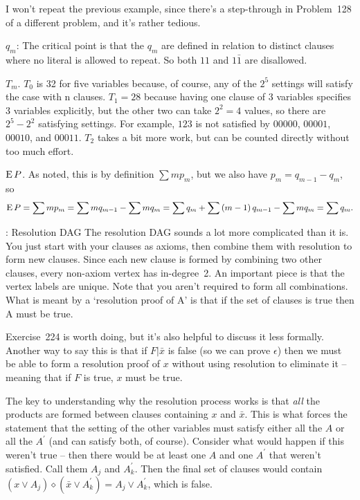 I won't repeat the previous example, since there's a step-through in 
Problem~128 of a different problem, and it's rather tedious.


 $q_m$: The critical point is that the $q_m$ are defined
in relation to distinct clauses where no literal is allowed to repeat.  So
both $11$ and $1 \bar 1$ are disallowed.

 $T_m$.  $T_0$ is 32 for five variables because, of course,
any of the $2^5$ settings will satisfy the case with n clauses.  $T_1 = 28$
because having one clause of 3 variables specifies 3 variables explicitly,
but the other two can take $2^2 = 4$ values, so there are $2^5 - 2^2$
satisfying settings.  For example, $123$ is not satisfied by $00000$,
$00001$, $00010$, and $00011$.  $T_2$ takes a bit more work, but
can be counted directly without too much effort.

 ${\rm E}\,P$.  As noted, this is by definition $\sum m p_m$,
but we also have $p_m = q_{m-1} - q_m$, so
$$
 {\rm E}\,P = \sum m p_m = \sum m q_{m-1} - \sum m q_m =
  \sum q_m + \sum \left(m - 1\right) q_{m - 1} - \sum m q_m = \sum q_m .
$$


: Resolution DAG \hfil\break
The resolution DAG sounds a lot more complicated than it is.
You just start with your clauses as axioms, then combine them with resolution
to form new clauses.  Since each new clause is formed by combining two
other clauses, every non-axiom vertex has in-degree~2.  An important piece is
that the vertex labels are unique.  Note that you aren't required to form all combinations.
What is meant by a `resolution proof of A' is that if the set of clauses is true then A must
be true.

 Exercise~224 is worth doing, but it's also helpful to discuss it
less formally.  Another way to say this is that if $F | \bar{x}$ is false (so we
can prove $\epsilon$) then we must be able to form a resolution proof of $x$ without
using resolution to eliminate it -- meaning that if $F$ is true, $x$ must be true.


 The key to understanding why the resolution process works
is that {\it all} the products are formed between clauses containing $x$ and $\bar x$.
This is what forces the statement that the setting of the other variables must
satisfy either all the $A$ or all the $A^{\prime}$ (and can satisfy both, of course).
Consider what would happen if this weren't true -- then there would be at least
one $A$ and one $A^{\prime}$ that weren't satisfied.  Call them $A_j$ and $A^{\prime}_k$.
Then the final set of clauses would contain 
$\left(x \vee A_j\right) \diamond \left(\bar x \vee A^{\prime}_k\right) = A_j \vee A^{\prime}_k$,
which is false.

\bye
